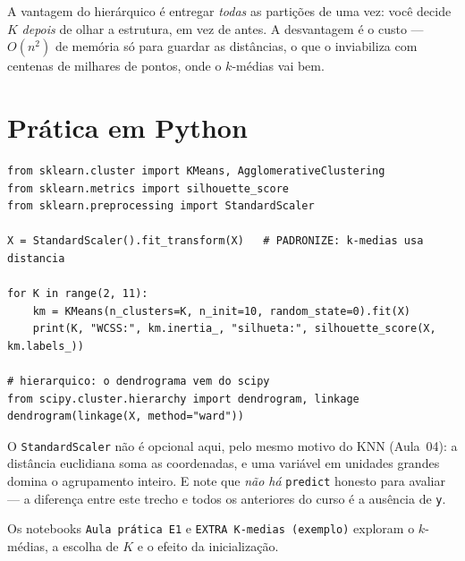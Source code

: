 \documentclass[11pt,a4paper]{article}
\begin{document}
\begin{ideia}
A vantagem do hierárquico é entregar \emph{todas} as partições de uma vez: você
decide $K$ \emph{depois} de olhar a estrutura, em vez de antes. A desvantagem é o
custo --- $O(n^2)$ de memória só para guardar as distâncias, o que o inviabiliza
com centenas de milhares de pontos, onde o $k$-médias vai bem.
\end{ideia}

\section{Prática em Python}
\begin{lstlisting}
from sklearn.cluster import KMeans, AgglomerativeClustering
from sklearn.metrics import silhouette_score
from sklearn.preprocessing import StandardScaler

X = StandardScaler().fit_transform(X)   # PADRONIZE: k-medias usa distancia

for K in range(2, 11):
    km = KMeans(n_clusters=K, n_init=10, random_state=0).fit(X)
    print(K, "WCSS:", km.inertia_, "silhueta:", silhouette_score(X, km.labels_))

# hierarquico: o dendrograma vem do scipy
from scipy.cluster.hierarchy import dendrogram, linkage
dendrogram(linkage(X, method="ward"))
\end{lstlisting}

\begin{atencao}
O \texttt{StandardScaler} não é opcional aqui, pelo mesmo motivo do KNN (Aula~04):
a distância euclidiana soma as coordenadas, e uma variável em unidades grandes
domina o agrupamento inteiro. E note que \emph{não há} \texttt{predict} honesto para
avaliar --- a diferença entre este trecho e todos os anteriores do curso é a
ausência de \texttt{y}.
\end{atencao}

Os notebooks \texttt{Aula prática E1} e \texttt{EXTRA K-medias (exemplo)} exploram o
$k$-médias, a escolha de $K$
e o efeito da inicialização.

\end{document}
